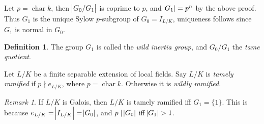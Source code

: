 \documentclass[11pt]{article}
\theoremstyle{definition}
\newtheorem{definition}{Definition}[subsection]
\theoremstyle{plain}
\theoremstyle{remark}
\newtheorem*{remark}{Remark}
\DeclareMathOperator{\Char}{char}
\begin{document}
Let $p = \Char{k}$, then $\abs{G_0 / G_1}$ is coprime to $p$, and $\abs{G_1} = p^n$ by the above proof. Thus $G_1$ is the unique Sylow $p$-subgroup of $G_0 = I_{L/K}$, uniqueness follows since $G_1$ is normal in $G_0$.

\begin{definition}\label{def:14_4}
    The group $G_1$ is called the \emph{wild inertia group}, and $G_0 / G_1$ the \emph{tame quotient}.

    Let $L/K$ be a finite separable extension of local fields. Say $L/K$ is \emph{tamely ramified} if $p \nmid e_{L/K}$, where $p = \Char k$. Otherwise it is \emph{wildly ramified}.
\end{definition}

\begin{remark}
    If $L/K$ is Galois, then $L/K$ is tamely ramified iff $G_1 = \{1\}$. This is because $e_{L/K} = \abs{I_{L/K}} = \abs{G_0}$, and $p \mid \abs{G_0}$ iff $\abs{G_1} > 1$.
\end{remark}
\end{document}

